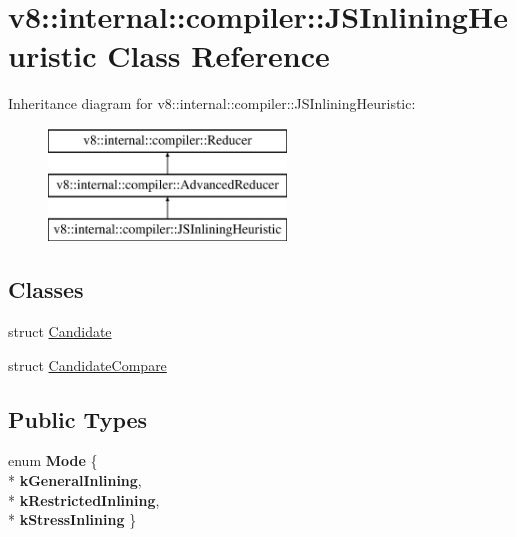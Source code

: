 \hypertarget{classv8_1_1internal_1_1compiler_1_1_j_s_inlining_heuristic}{}\section{v8\+:\+:internal\+:\+:compiler\+:\+:J\+S\+Inlining\+Heuristic Class Reference}
\label{classv8_1_1internal_1_1compiler_1_1_j_s_inlining_heuristic}
Inheritance diagram for v8\+:\+:internal\+:\+:compiler\+:\+:J\+S\+Inlining\+Heuristic\+:\begin{figure}[H]
\begin{center}
\leavevmode
\includegraphics[height=3.000000cm]{classv8_1_1internal_1_1compiler_1_1_j_s_inlining_heuristic}
\end{center}
\end{figure}
\subsection*{Classes}
\begin{DoxyCompactItemize}
\item 
struct \hyperlink{structv8_1_1internal_1_1compiler_1_1_j_s_inlining_heuristic_1_1_candidate}{Candidate}
\item 
struct \hyperlink{structv8_1_1internal_1_1compiler_1_1_j_s_inlining_heuristic_1_1_candidate_compare}{Candidate\+Compare}
\end{DoxyCompactItemize}
\subsection*{Public Types}
\begin{DoxyCompactItemize}
\item 
enum {\bfseries Mode} \{ \\*
{\bfseries k\+General\+Inlining}, 
\\*
{\bfseries k\+Restricted\+Inlining}, 
\\*
{\bfseries k\+Stress\+Inlining}
 \}\hypertarget{classv8_1_1internal_1_1compiler_1_1_j_s_inlining_heuristic_a460dfd6f51f754658f4d9d8b155fc66e}{}\label{classv8_1_1internal_1_1compiler_1_1_j_s_inlining_heuristic_a460dfd6f51f754658f4d9d8b155fc66e}

\end{DoxyCompactItemize}
